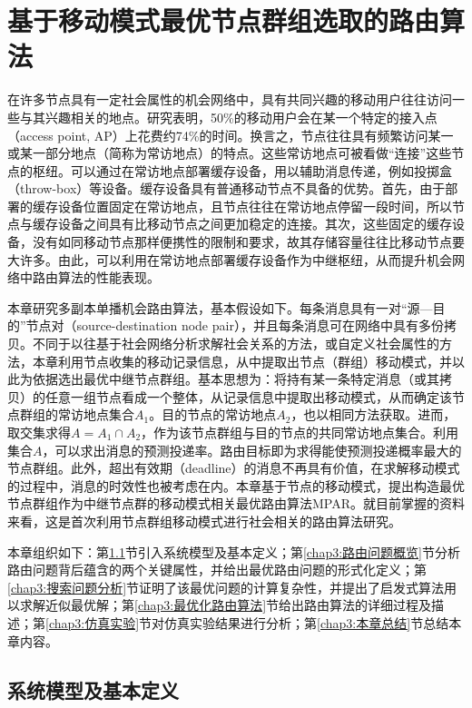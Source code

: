 \chapter{基于移动模式最优节点群组选取的路由算法}
\label{chap:基于移动模式最优节点群组选取的路由算法}

在许多节点具有一定社会属性的机会网络中，具有共同兴趣的移动用户往往访问一些与其兴趣相关的地点。研究表明，50\%的移动用户会在某一个特定的接入点（access point, AP）上花费约74\%的时间。换言之，节点往往具有频繁访问某一或某一部分地点（简称为常访地点）的特点。这些常访地点可被看做``连接''这些节点的枢纽。可以通过在常访地点部署缓存设备，用以辅助消息传递，例如投掷盒（throw-box）等设备。缓存设备具有普通移动节点不具备的优势。首先，由于部署的缓存设备位置固定在常访地点，且节点往往在常访地点停留一段时间，所以节点与缓存设备之间具有比移动节点之间更加稳定的连接。其次，这些固定的缓存设备，没有如同移动节点那样便携性的限制和要求，故其存储容量往往比移动节点要大许多。由此，可以利用在常访地点部署缓存设备作为中继枢纽，从而提升机会网络中路由算法的性能表现。

本章研究多副本单播机会路由算法，基本假设如下。每条消息具有一对“源—目的”节点对（source-destination node pair），并且每条消息可在网络中具有多份拷贝。不同于以往基于社会网络分析求解社会关系的方法，或自定义社会属性的方法，本章利用节点收集的移动记录信息，从中提取出节点（群组）移动模式，并以此为依据选出最优中继节点群组。基本思想为：将持有某一条特定消息（或其拷贝）的任意一组节点看成一个整体，从记录信息中提取出移动模式，从而确定该节点群组的常访地点集合$A_1$。目的节点的常访地点$A_2$，也以相同方法获取。进而，取交集求得$A=A_1\cap A_2$，作为该节点群组与目的节点的共同常访地点集合。利用集合$A$，可以求出消息的预测投递率。路由目标即为求得能使预测投递概率最大的节点群组。此外，超出有效期（deadline）的消息不再具有价值，在求解移动模式的过程中，消息的时效性也被考虑在内。本章基于节点的移动模式，提出构造最优节点群组作为中继节点群的移动模式相关最优路由算法MPAR。就目前掌握的资料来看，这是首次利用节点群组移动模式进行社会相关的路由算法研究。

本章组织如下：第\ref{chap3:系统模型及基本定义}节引入系统模型及基本定义；第\ref{chap3:路由问题概览}节分析路由问题背后蕴含的两个关键属性，并给出最优路由问题的形式化定义；第\ref{chap3:搜索问题分析}节证明了该最优问题的计算复杂性，并提出了启发式算法用以求解近似最优解；第\ref{chap3:最优化路由算法}节给出路由算法的详细过程及描述；第\ref{chap3:仿真实验}节对仿真实验结果进行分析；第\ref{chap3:本章总结}节总结本章内容。

\section{系统模型及基本定义}
\label{chap3:系统模型及基本定义}


